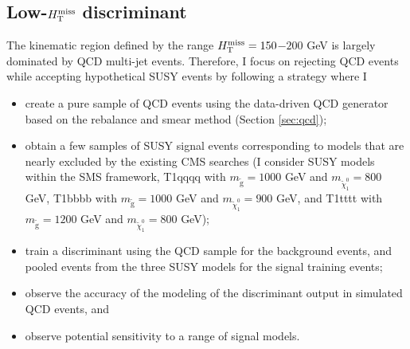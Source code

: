 \subsection{Low-$H_{\text{T}}^{\rm miss}$ discriminant}
The kinematic region defined by the range $H_{\text{T}}^{\rm miss}=150$$-$$200$ GeV is largely dominated by QCD multi-jet events. Therefore, I focus on rejecting QCD events while accepting hypothetical SUSY events by following a strategy where I
\begin{itemize}
\item create a pure sample of QCD events using the data-driven QCD generator based on the rebalance and smear method (Section \ref{sec:qcd});
\item obtain a few samples of SUSY signal events corresponding to models that are nearly excluded by the existing CMS searches (I consider SUSY models within the SMS framework, T1qqqq with $m_{\tilde{\text{g}}}=1000$ GeV and $m_{\tilde{\chi}^{0}_{1}}=800$ GeV,  T1bbbb with $m_{\tilde{\text{g}}}=1000$ GeV and $m_{\tilde{\chi}^{0}_{1}}=900$ GeV, and T1tttt with $m_{\tilde{\text{g}}}=1200$ GeV and $m_{\tilde{\chi}^{0}_{1}}=800$ GeV);
\item train a discriminant using the QCD sample for the background events, and pooled events from the three SUSY models for the signal training events;
\item observe the accuracy of the modeling of the discriminant output in simulated QCD events, and
\item observe potential sensitivity to a range of signal models.
\end{itemize}

